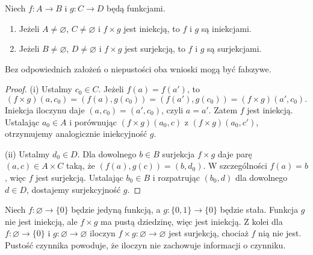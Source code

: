 \begin{twierdzenie}
\label{thm:product-converses-xliv}
Niech $f:A\to B$ i $g:C\to D$ będą funkcjami.
\begin{enumerate}[label=(\roman*)]
\item Jeżeli $A\ne\varnothing$, $C\ne\varnothing$ i
$f\times g$ jest iniekcją, to $f$ i $g$ są iniekcjami.
\item Jeżeli $B\ne\varnothing$, $D\ne\varnothing$ i
$f\times g$ jest surjekcją, to $f$ i $g$ są surjekcjami.
\end{enumerate}
Bez odpowiednich założeń o niepustości oba wnioski mogą być fałszywe.
\end{twierdzenie}
\begin{proof}
(i) Ustalmy $c_0\in C$. Jeżeli $f(a)=f(a')$, to
\[
 (f\times g)(a,c_0)=(f(a),g(c_0))
 =(f(a'),g(c_0))=(f\times g)(a',c_0).
\]
Iniekcja iloczynu daje $(a,c_0)=(a',c_0)$, czyli $a=a'$.
Zatem $f$ jest iniekcją. Ustalając $a_0\in A$ i
porównując $(f\times g)(a_0,c)$ z
$(f\times g)(a_0,c')$, otrzymujemy analogicznie
iniekcyjność $g$.

(ii) Ustalmy $d_0\in D$. Dla dowolnego $b\in B$
surjekcja $f\times g$ daje parę $(a,c)\in A\times C$
taką, że $(f(a),g(c))=(b,d_0)$. W szczególności
$f(a)=b$, więc $f$ jest surjekcją. Ustalając
$b_0\in B$ i rozpatrując $(b_0,d)$ dla dowolnego
$d\in D$, dostajemy surjekcyjność $g$.
\end{proof}
\begin{przyklad}
Niech $f:\varnothing\to\{0\}$ będzie jedyną funkcją,
a $g:\{0,1\}\to\{0\}$ będzie stała. Funkcja $g$
nie jest iniekcją, ale $f\times g$ ma pustą dziedzinę,
więc jest iniekcją. Z kolei dla
$f:\varnothing\to\{0\}$ i $g:\varnothing\to\varnothing$
iloczyn $f\times g:\varnothing\to\varnothing$ jest
surjekcją, chociaż $f$ nią nie jest. Pustość czynnika
powoduje, że iloczyn nie zachowuje informacji o czynniku.
\end{przyklad}

